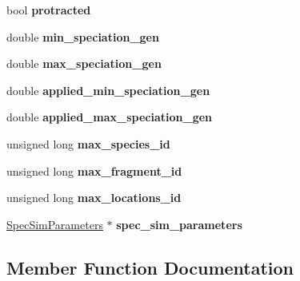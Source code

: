 \begin{DoxyCompactItemize}
\item 
bool {\bfseries protracted}\hypertarget{class_community_acab5a676e365934f9dfd2148ab9d5a60}{}\label{class_community_acab5a676e365934f9dfd2148ab9d5a60}

\item 
double {\bfseries min\+\_\+speciation\+\_\+gen}\hypertarget{class_community_a6b906ec2096b22631b60aa3511925fe0}{}\label{class_community_a6b906ec2096b22631b60aa3511925fe0}

\item 
double {\bfseries max\+\_\+speciation\+\_\+gen}\hypertarget{class_community_aeff6623b51fdd177e87b6eebfba27080}{}\label{class_community_aeff6623b51fdd177e87b6eebfba27080}

\item 
double {\bfseries applied\+\_\+min\+\_\+speciation\+\_\+gen}\hypertarget{class_community_aa5e9946a354a46d675e015d803cc7fa1}{}\label{class_community_aa5e9946a354a46d675e015d803cc7fa1}

\item 
double {\bfseries applied\+\_\+max\+\_\+speciation\+\_\+gen}\hypertarget{class_community_a77d20815b5638387ce186130657ec660}{}\label{class_community_a77d20815b5638387ce186130657ec660}

\item 
unsigned long {\bfseries max\+\_\+species\+\_\+id}\hypertarget{class_community_a31f80e452a92aabdf2d9ba7bcc798f84}{}\label{class_community_a31f80e452a92aabdf2d9ba7bcc798f84}

\item 
unsigned long {\bfseries max\+\_\+fragment\+\_\+id}\hypertarget{class_community_a5de3afc536570241b82489d1b9c87d03}{}\label{class_community_a5de3afc536570241b82489d1b9c87d03}

\item 
unsigned long {\bfseries max\+\_\+locations\+\_\+id}\hypertarget{class_community_ae503af91bc33ed302a363098a3b49a61}{}\label{class_community_ae503af91bc33ed302a363098a3b49a61}

\item 
\hyperlink{struct_spec_sim_parameters}{Spec\+Sim\+Parameters} $\ast$ {\bfseries spec\+\_\+sim\+\_\+parameters}\hypertarget{class_community_a45df8aefb9914e7c8f3133143069ca35}{}\label{class_community_a45df8aefb9914e7c8f3133143069ca35}

\end{DoxyCompactItemize}


\subsection{Member Function Documentation}
